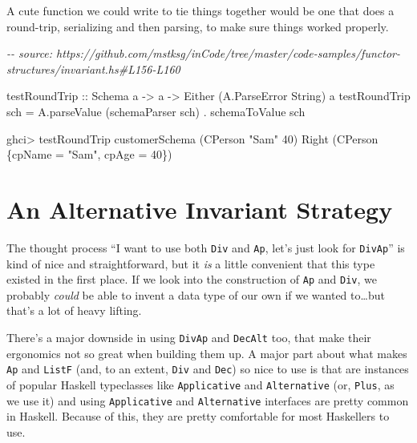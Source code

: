 \documentclass[]{article}
\newenvironment{Shaded}{}{}
\newcommand{\CommentTok}[1]{\textcolor[rgb]{0.38,0.63,0.69}{\textit{#1}}}
\newcommand{\DataTypeTok}[1]{\textcolor[rgb]{0.56,0.13,0.00}{#1}}
\newcommand{\DecValTok}[1]{\textcolor[rgb]{0.25,0.63,0.44}{#1}}
\newcommand{\NormalTok}[1]{#1}
\newcommand{\OperatorTok}[1]{\textcolor[rgb]{0.40,0.40,0.40}{#1}}
\newcommand{\OtherTok}[1]{\textcolor[rgb]{0.00,0.44,0.13}{#1}}
\newcommand{\StringTok}[1]{\textcolor[rgb]{0.25,0.44,0.63}{#1}}
\begin{document}
A cute function we could write to tie things together would be one that does a
round-trip, serializing and then parsing, to make sure things worked properly.

\begin{Shaded}
\begin{Highlighting}[]
\CommentTok{{-}{-} source: https://github.com/mstksg/inCode/tree/master/code{-}samples/functor{-}structures/invariant.hs\#L156{-}L160}

\NormalTok{testRoundTrip}
\OtherTok{    ::} \DataTypeTok{Schema}\NormalTok{ a}
    \OtherTok{{-}>}\NormalTok{ a}
    \OtherTok{{-}>} \DataTypeTok{Either}\NormalTok{ (}\DataTypeTok{A.ParseError} \DataTypeTok{String}\NormalTok{) a}
\NormalTok{testRoundTrip sch }\OtherTok{=}\NormalTok{ A.parseValue (schemaParser sch) }\OperatorTok{.}\NormalTok{ schemaToValue sch}
\end{Highlighting}
\end{Shaded}

\begin{Shaded}
\begin{Highlighting}[]
\NormalTok{ghci}\OperatorTok{>}\NormalTok{ testRoundTrip customerSchema (}\DataTypeTok{CPerson} \StringTok{"Sam"} \DecValTok{40}\NormalTok{)}
\DataTypeTok{Right}\NormalTok{ (}\DataTypeTok{CPerson}\NormalTok{ \{cpName }\OtherTok{=} \StringTok{"Sam"}\NormalTok{, cpAge }\OtherTok{=} \DecValTok{40}\NormalTok{\})}
\end{Highlighting}
\end{Shaded}

\hypertarget{an-alternative-invariant-strategy}{%
\section{An Alternative Invariant
Strategy}\label{an-alternative-invariant-strategy}}

The thought process ``I want to use both \texttt{Div} and \texttt{Ap}, let's
just look for \texttt{DivAp}'' is kind of nice and straightforward, but it
\emph{is} a little convenient that this type existed in the first place. If we
look into the construction of \texttt{Ap} and \texttt{Div}, we probably
\emph{could} be able to invent a data type of our own if we wanted to\ldots but
that's a lot of heavy lifting.

There's a major downside in using \texttt{DivAp} and \texttt{DecAlt} too, that
make their ergonomics not so great when building them up. A major part about
what makes \texttt{Ap} and \texttt{ListF} (and, to an extent, \texttt{Div} and
\texttt{Dec}) so nice to use is that are instances of popular Haskell
typeclasses like \texttt{Applicative} and \texttt{Alternative} (or,
\texttt{Plus}, as we use it) and using \texttt{Applicative} and
\texttt{Alternative} interfaces are pretty common in Haskell. Because of this,
they are pretty comfortable for most Haskellers to use.
\end{document}
